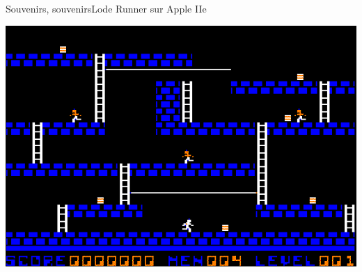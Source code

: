 \documentclass[11pt,mathserif]{beamer}
\begin{document}
\begin{frame}{Souvenirs, souvenirs}{Lode Runner sur Apple IIe}
  \begin{center}
  \includegraphics[width=0.8\linewidth]{fig/lode_runner.png}
  \end{center}
\end{frame}
\end{document}
